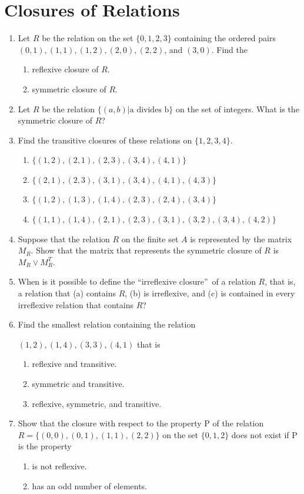 \documentclass{sig-alternate-05-2015}
\begin{document}
\section{Closures of Relations}
\begin{enumerate}
\item Let $R$ be the relation on the set $\{0, 1, 2, 3\}$ containing the ordered pairs $(0, 1), (1, 1), (1, 2), (2, 0), (2, 2)$, and $(3, 0)$. Find the
	\begin{enumerate}
		\item reflexive closure of $R$.
		\item symmetric closure of $R$.
	\end{enumerate}

\item Let $R$ be the relation $\{(a, b) | \text{a divides b}\}$ on the set of
integers. What is the symmetric closure of $R$?
	
\item Find the transitive closures of these relations on $\{1, 2, 3, 4\}$.
	\begin{enumerate}
		\item $\{(1, 2), (2,1), (2,3), (3,4), (4,1)\}$
		\item $\{(2, 1), (2,3), (3,1), (3,4), (4,1), (4, 3)\}$
		\item $\{(1, 2), (1,3), (1,4), (2,3), (2,4), (3, 4)\}$
		\item $\{(1, 1), (1,4), (2,1), (2,3), (3,1), (3, 2), (3,4), (4, 2)\}$
	\end{enumerate}
	
\item Suppose that the relation $R$ on the finite set $A$ is represented by the matrix $M_R$. Show that the matrix that represents the symmetric closure of $R$ is $M_R \vee M^T_R$.

\item When is it possible to define the \textquotedblleft irreflexive closure\textquotedblright\ of a relation $R$, that is, a relation that (a) contains $R$, (b) is irreflexive,
and (c) is contained in every irreflexive relation
that contains $R$?
	
\item Find the smallest relation containing the relation
	
	${(1, 2), (1, 4), (3, 3), (4, 1)}$ that is
	\begin{enumerate}
		\item reflexive and transitive.
		\item symmetric and transitive.
		\item reflexive, symmetric, and transitive.
	\end{enumerate}
	
\item Show that the closure with respect to the property P of
the relation $R = \{(0, 0), (0, 1), (1, 1), (2, 2)\}$ on the set
$\{0, 1, 2\}$ does not exist if P is the property
	\begin{enumerate}
		\item is not reflexive.
		\item has an odd number of elements.
	\end{enumerate}
\end{enumerate}
\end{document}
